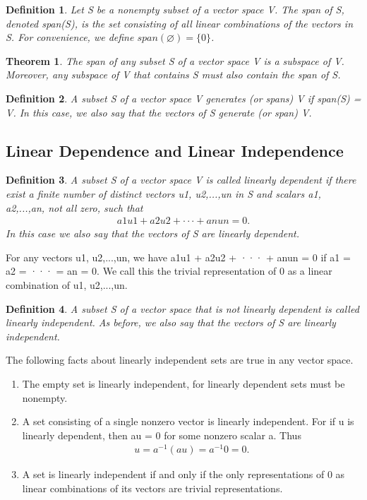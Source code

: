 \documentclass{article}
\theoremstyle{plain}
\newtheorem{theorem}{Theorem}[section]
\newtheorem*{definition1}{Definition}
\theoremstyle{plain} %
\begin{document}
\begin{definition1}
Let S be a nonempty subset of a vector space V. The span of S, denoted span(S), is the set consisting of all linear combinations of the vectors in S. For convenience, we define $span(\varnothing) = \{0\}$.
\end{definition1}

\begin{theorem}
The span of any subset S of a vector space V is a subspace of V. Moreover, any subspace of V that contains S must also contain the span of S.
\end{theorem}

\begin{definition1}
A subset S of a vector space V generates (or spans) V if span(S) = V. In this case, we also say that the vectors of S generate (or span) V.
\end{definition1}

\subsection{Linear Dependence and Linear Independence}

\begin{definition1}
A subset S of a vector space V is called linearly dependent if there exist a finite number of distinct vectors u1, u2,...,un in S and scalars a1, a2,...,an, not all zero, such that
\begin{align*}
a1u1 + a2u2 + ··· + anun = 0 .
\end{align*}
In this case we also say that the vectors of S are linearly dependent.
\end{definition1}

For any vectors u1, u2,...,un, we have a1u1 + a2u2 + ··· + anun = 0 if a1 = a2 = ··· = an = 0. We call this the trivial representation of 0 as a linear combination of u1, u2,...,un.

\begin{definition1}
A subset S of a vector space that is not linearly dependent is called linearly independent. As before, we also say that the vectors of S are linearly independent.
\end{definition1}

The following facts about linearly independent sets are true in any vector
space.
\begin{enumerate}
\item The empty set is linearly independent, for linearly dependent sets must be nonempty.
\item A set consisting of a single nonzero vector is linearly independent. For if {u} is linearly dependent, then au = 0 for some nonzero scalar a. Thus
\begin{align*}
u = a^{-1}(au) = a^{-1}0 = 0 .
\end{align*}
\item A set is linearly independent if and only if the only representations of 0 as linear combinations of its vectors are trivial representations.
\end{enumerate}
\end{document}
